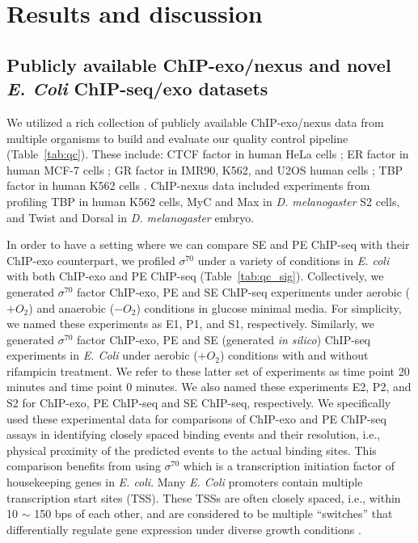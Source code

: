 \documentclass{bmcart}
\newcommand{\sig}{\sigma^{70}}
\begin{document}
\section*{Results and discussion}
\label{sec:results}

\subsection*{Publicly available ChIP-exo/nexus and novel \textit{E. Coli} ChIP-seq/exo datasets}

We utilized a rich collection of publicly available ChIP-exo/nexus data from multiple organisms to build and evaluate our quality control pipeline (Table~\ref{tab:qc}). These include: CTCF factor in human HeLa cells \cite{exo1}; ER factor in human MCF-7 cells \cite{exoillumina}; GR factor in IMR90, K562, and U2OS human cells \cite{starick15}; TBP factor in human K562 cells \cite{venters13}. ChIP-nexus data included experiments from \cite{chipnexus} profiling TBP in human K562 cells, MyC and Max in \textit{D. melanogaster} S2 cells, and Twist and Dorsal in \textit{D. melanogaster} embryo.

In order to have a setting where we can compare SE and PE ChIP-seq with their ChIP-exo counterpart, we profiled $\sig$ under a variety of conditions in \textit{E. coli} with both ChIP-exo and PE ChIP-seq (Table~\ref{tab:qc_sig}). Collectively, we generated $\sig$ factor ChIP-exo, PE and SE ChIP-seq experiments under aerobic ($+O_2$) and anaerobic ($-O_2$) conditions in glucose minimal media. For simplicity, we named these experiments as E1, P1, and S1, respectively. Similarly, we generated $\sig$ factor ChIP-exo, PE and SE (generated \textit{in   silico}) ChIP-seq experiments in \textit{E. Coli} under aerobic ($+O_2$) conditions with and without rifampicin treatment. We refer to these latter set of experiments as time point 20 minutes and time point 0 minutes. We also named these experiments E2, P2, and S2 for ChIP-exo, PE ChIP-seq and SE ChIP-seq, respectively. We specifically used these experimental data for comparisons of ChIP-exo and PE ChIP-seq assays in identifying closely spaced binding events and their resolution, i.e., physical proximity of the predicted events to the actual binding sites.  This comparison benefits from using $\sig$ which is a transcription initiation factor of housekeeping genes in \textit{E. coli}. Many \textit{E. Coli} promoters contain multiple transcription start sites (TSS). These TSSs are often closely spaced, i.e., within 10 $\sim$ 150 bps of each other, and are considered to be multiple ``switches'' that differentially regulate gene expression under diverse growth conditions \cite{regulondb}.
\end{document}
